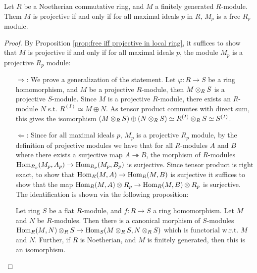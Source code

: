 \documentclass{article}
\begin{document}
\begin{corollary}
    Let $R$ be a Noetherian commutative ring, and $M$ a finitely generated $R$-module. Them $M$ is projective if and only if for all maximal ideals $p$ in $R$, $M_p$ is a free $R_p$ module.
\end{corollary}

\begin{proof}
    By Proposition \ref{prop:free iff projective in local ring}, it suffices to show that $M$ is projective if and only if for all maximal ideals $p$, the module $M_p$ is a projective $R_p$ module:
    \begin{enumerate}
        \item[$\Rightarrow$:] We prove a generalization of the statement. Let $\varphi: R \to S$ be a ring homomorphism, and $M$ be a projective $R$-module, then $M \otimes_R S$ is a projective $S$-module. Since $M$ is a projective $R$-module, there exists an $R$-module $N$ s.t. $R^{(I)} \simeq M \oplus N$. As tensor product commutes with direct sum, this gives the isomorphism $(M \otimes_R S) \oplus (N \otimes_R S) \simeq R^{(I)} \otimes_R S \simeq S^{(I)}$.
        \item[$\Leftarrow$:] Since for all maximal ideals $p$, $M_p$ is a projective $R_p$ module, by the definition of projective modules we have that for all $R$-modules $A$ and $B$ where there exists a surjective map $A \twoheadrightarrow B$, the morphism of $R$-modules $\mathrm{Hom}_{R_p} (M_p, A_p) \to \mathrm{Hom}_{R_p}(M_p, B_p)$ is surjective. Since tensor product is right exact, to show that $\mathrm{Hom}_R(M, A) \to \mathrm{Hom}_R(M, B)$ is surjective it suffices to show that the map $\mathrm{Hom}_R(M, A) \otimes R_p \to \mathrm{Hom}_R(M, B) \otimes R_p$ is surjective. The identification is shown via the following proposition:

        \begin{proposition}
            Let ring $S$ be a flat $R$-module, and $f: R \to S$ a ring homomorphism. Let $M$ and $N$ be $R$-modules. Then there is a canonical morphism of $S$-modules $\mathrm{Hom}_R(M, N) \otimes_R S \to \mathrm{Hom}_S(M \otimes_R S, N \otimes_R S)$ which is functorial w.r.t. $M$ and $N$. Further, if $R$ is Noetherian, and $M$ is finitely generated, then this is an isomorphism.
        \end{proposition}


\end{enumerate}
\end{proof}
\end{document}
